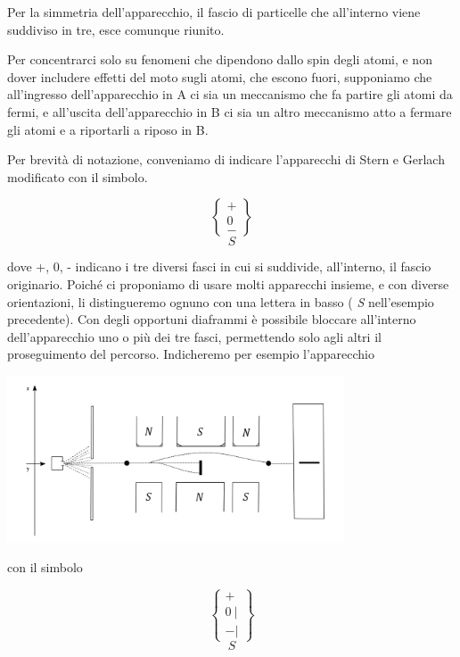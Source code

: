 \documentclass[a4paper,12pt,oneside]{book}
\begin{document}
Per la simmetria dell'apparecchio, il fascio di particelle che all'interno viene suddiviso in tre, esce comunque riunito.

Per concentrarci solo su fenomeni che dipendono dallo spin degli atomi, e non  dover includere effetti del moto sugli atomi, che escono fuori, supponiamo che all'ingresso dell'apparecchio in A ci sia un meccanismo che fa partire gli atomi da fermi, e all'uscita dell'apparecchio in B ci sia un altro meccanismo atto a fermare gli atomi e a riportarli a riposo in B.

Per brevità  di notazione, conveniamo di indicare l'apparecchi di Stern e Gerlach modificato con il simbolo.

\begin{equation}
\begin{Bmatrix} + \\ 0 \\ -  \end{Bmatrix}
\end{equation}
\begin{equation*}
S
\end{equation*}
 
 dove +, 0, - indicano i tre diversi fasci in cui si suddivide, all'interno, il fascio originario. Poiché ci proponiamo di usare molti apparecchi insieme, e con diverse orientazioni, li distingueremo ognuno con una lettera in basso ( \emph{S} nell'esempio precedente). Con degli opportuni diaframmi è possibile bloccare all'interno dell'apparecchio uno o più dei tre fasci, permettendo solo agli altri il proseguimento del percorso. Indicheremo per esempio l'apparecchio \\
\begin{center}
\includegraphics[width=10cm]{immagini/cap_3/fig_3_4.png}
\end{center}
 
con il simbolo
 
\begin{equation}
\begin{Bmatrix} + \\ 0\ | \\ -  |  
\end{Bmatrix}
\label{SG1}
\end{equation}
\begin{equation*}
S
\end{equation*}
 
\end{document}

